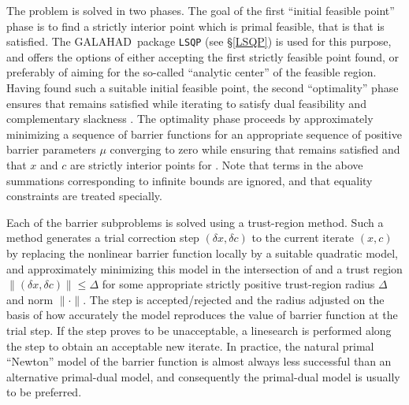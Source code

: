 \documentclass[twoside]{article}
\newcommand{\gal}{{\sf GALAHAD}}
\begin{document}
The problem is solved in two phases. The goal of the first
``initial feasible point'' phase is
to find a strictly interior point which is primal feasible, that is that
 is satisfied. The \gal\ package {\tt LSQP} (see \S\ref{LSQP})
is used for this purpose, and offers the options of either accepting the first
strictly feasible point found, or preferably of aiming for the
so-called ``analytic center'' of the feasible region.
Having found such a suitable initial feasible point, the second ``optimality''
phase ensures that  remains satisfied while iterating to
satisfy dual feasibility  and complementary slackness .
The optimality phase proceeds by approximately minimizing a
sequence of barrier functions
for an appropriate sequence of positive barrier parameters $\mu$
converging to zero
while ensuring that  remains satisfied and that
$x$ and $c$ are strictly interior points for .
Note that terms in the above summations corresponding to infinite bounds are
ignored, and that equality constraints are treated specially.

Each of the barrier subproblems is solved using a trust-region method.
Such a method generates a trial correction step $(\delta x, \delta c)$
to the current iterate $(x, c)$
by replacing the nonlinear barrier function locally by a suitable
quadratic model, and approximately minimizing this model in the
intersection of 
and a trust region $\|( \delta x,  \delta c)\| \leq \Delta$
for some appropriate
strictly positive trust-region radius $\Delta$ and norm $\| \cdot \|$.
The step is accepted/rejected
and the radius adjusted on the basis of how accurately the model reproduces the
value of barrier function at the trial step. If the step proves to be
unacceptable, a linesearch is performed along the step to obtain an acceptable
new iterate. In practice, the natural primal ``Newton'' model of the barrier
function is almost always
less successful than an alternative primal-dual model,
and consequently the primal-dual model is usually to be preferred.
\end{document}
